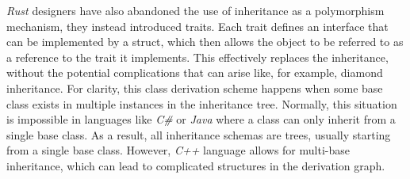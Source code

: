 \textit{Rust} designers have also abandoned the use of inheritance as a polymorphism mechanism, they instead introduced traits. Each trait defines an interface that can be implemented by a struct, which then allows the object to be referred to as a reference to the trait it implements. This effectively replaces the inheritance, without the potential complications that can arise like, for example, diamond inheritance. For clarity, this class derivation scheme happens when some base class exists in multiple instances in the inheritance tree. Normally, this situation is impossible in languages like \textit{C\#} or \textit{Java} where a class can only inherit from a single base class. As a result, all inheritance schemas are trees, usually starting from a single base class. However, \textit{C++} language allows for multi-base inheritance, which can lead to complicated structures in the derivation graph.


%
%
%    


